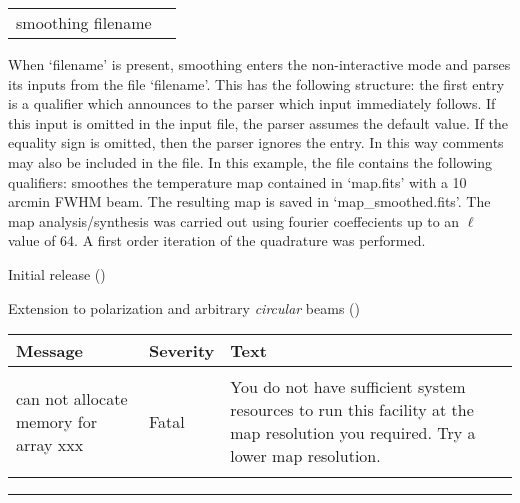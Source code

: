 \vfill\newpage

\begin{examples}{2}
{
\begin{tabular}{ll} %
smoothing  filename \\
\end{tabular}
}
{When `filename' is present, smoothing enters the non-interactive mode and parses
its inputs from the file `filename'. This has the following
structure: the first entry is a qualifier which announces to the parser
which input immediately follows. If this input is omitted in the
input file, the parser assumes the default value.
If the equality sign is omitted, then the parser ignores the entry.
In this way comments may also be included in the file.
In this example, the file contains the following
qualifiers:\hfill\newline
{}
smoothes the \healpix temperature map contained in `map.fits' with 
a 10 arcmin FWHM beam. The resulting map is saved 
in `map\_smoothed.fits'. The map analysis/synthesis was carried 
out using fourier coeffecients up to an $\ell$ value of 64. A first
order iteration of the quadrature was performed.}

\end{examples}

\begin{release}
  \begin{relist}
    \item Initial release ()
    \item Extension to polarization and arbitrary {\em circular} beams ()
  \end{relist}
\end{release}

\newpage
\begin{messages}
{
\begin{tabular}{p{0.25\hsize} p{0.1\hsize} p{0.35\hsize}} \hline  
  \textbf{Message} & \textbf{Severity} & \textbf{Text} \\ \hline
                   &                   &   \\ %
can not allocate memory for array xxx &  Fatal & You do not have
                   sufficient system resources to run this
                   facility at the map resolution you required. 
  Try a lower map resolution.  \\ 
                   &                   &   \\ \hline %
\end{tabular}
} 
\end{messages}

\rule{\hsize}{2mm}

\newpage
